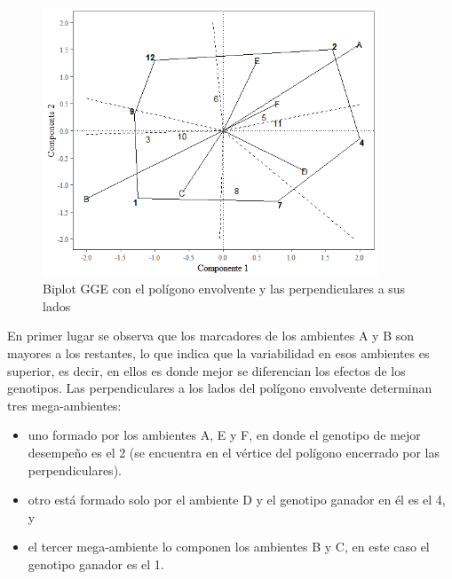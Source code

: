 \begin{figure}[h]
	\begin{center}
		\includegraphics[width=10cm]{./Graficos/poligono_GGE.png}
	\end{center}
	\caption{Biplot GGE con el polígono envolvente y las perpendiculares a sus lados}
	\label{fig:fig315}
\end{figure}


En primer lugar se observa que los marcadores de los ambientes A y B son mayores a los restantes, lo que indica que la variabilidad en esos ambientes es superior, es decir, en ellos es donde mejor se diferencian los efectos de los genotipos.
Las perpendiculares a los lados del polígono envolvente determinan tres mega-ambientes:
\begin{itemize}
\item uno formado por los ambientes A, E y F, en donde el genotipo de mejor desempeño es el 2 (se
encuentra en el vértice del polígono encerrado por las perpendiculares).
\item otro está formado solo por el ambiente D y el genotipo ganador en él es el 4, y
\item  el tercer mega-ambiente lo componen los ambientes B y C, en este caso el genotipo ganador es el 1.
\end{itemize}

